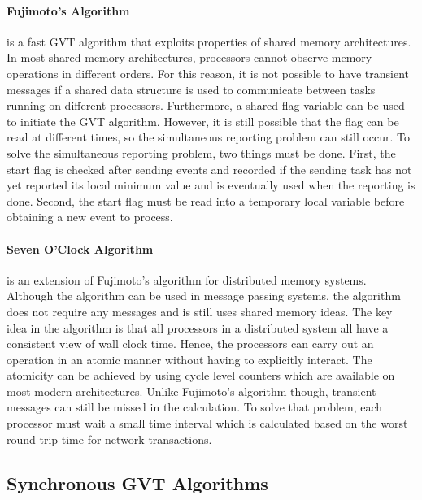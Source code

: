 \documentclass[11pt]{book}
\begin{document}
\paragraph{Fujimoto's Algorithm} \cite{fujimoto-94} is a fast GVT algorithm that exploits properties
of shared memory architectures.  In most shared memory architectures, processors cannot observe
memory operations in different orders.  For this reason, it is not possible to have transient
messages if a shared data structure is used to communicate between tasks running on different
processors.  Furthermore, a shared flag variable can be used to initiate the GVT algorithm.
However, it is still possible that the flag can be read at different times, so the simultaneous
reporting problem can still occur.  To solve the simultaneous reporting problem, two things must be
done. First, the start flag is checked after sending events and recorded if the sending task has not
yet reported its local minimum value and is eventually used when the reporting is done.  Second, the
start flag must be read into a temporary local variable before obtaining a new event to process.

\paragraph{Seven O'Clock Algorithm} \cite{bauer-05} is an extension of Fujimoto's algorithm for
distributed memory systems.  Although the algorithm can be used in message passing systems, the
algorithm does not require any messages and is still uses shared memory ideas.  The key idea in the
algorithm is that all processors in a distributed system all have a consistent view of wall clock time.
Hence, the processors can carry out an operation in an atomic manner without having to explicitly
interact.  The atomicity can be achieved by using cycle level counters which are available on most
modern architectures.  Unlike Fujimoto's algorithm though, transient messages can still be missed in
the calculation.  To solve that problem, each processor must wait a small time interval which is
calculated based on the worst round trip time for network transactions.

\subsection{Synchronous GVT Algorithms}
\end{document}
